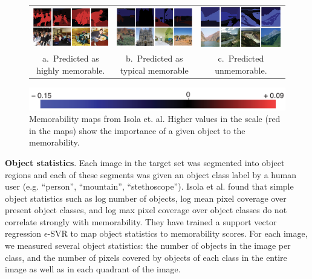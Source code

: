 \documentclass[10pt,twocolumn,letterpaper]{article}
\begin{document}
\begin{figure}[t]
  \centering
  \begin{tabular}{c c c}
  \includegraphics[width=0.33\linewidth]{figure/memorability/mem_top.pdf} &
  \includegraphics[width=0.33\linewidth]{figure/memorability/mem_middle.pdf} &
  \includegraphics[width=0.33\linewidth]{figure/memorability/mem_botom.pdf}\\
  a.~Predicted as highly memorable. & b.~Predicted as typical memorable & c.~Predicted unmemorable.\\
  \end{tabular}
  \includegraphics[width=.5\linewidth]{figure/memorability/mem_scale.pdf}
  \caption{Memorability maps from Isola et. al. Higher values in the scale (red in the maps) show the importance of a given object to the memorability.}
  \label{fig:mem_map}
\end{figure}

\textbf{Object statistics}. Each image in the target set was segmented into object regions and each of these segments was given an object class label by a human user (e.g. ``person'', ``mountain'', ``stethoscope''). Isola et al. found that simple object statistics such as log number of objects, log mean pixel coverage over present object classes, and log max pixel coverage over object classes do not correlate strongly with memorability. They have trained a support vector regression $\epsilon$-SVR to map object statistics to memorability scores. For each image, we measured several object statistics: the number of objects in the image per class, and the number of pixels covered by objects of each class in the entire image as well as in each quadrant of the image.
\end{document}
